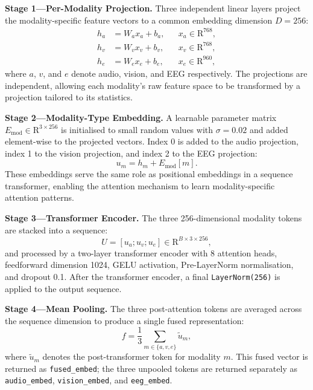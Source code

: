 \textbf{Stage 1---Per-Modality Projection.} Three independent linear layers project the modality-specific feature vectors to a common embedding dimension $D=256$:
\begin{equation}
\begin{aligned}
    h_a &= W_a x_a + b_a, && x_a \in \mathrm{R}^{768}, \\
    h_v &= W_v x_v + b_v, && x_v \in \mathrm{R}^{768}, \\
    h_e &= W_e x_e + b_e, && x_e \in \mathrm{R}^{960},
\end{aligned}
\end{equation}
where $a$, $v$, and $e$ denote audio, vision, and EEG respectively. The projections are independent, allowing each modality's raw feature space to be transformed by a projection tailored to its statistics.

\textbf{Stage 2---Modality-Type Embedding.} A learnable parameter matrix $E_{\mathrm{mod}}\in\mathrm{R}^{3\times256}$ is initialised to small random values with $\sigma=0.02$ and added element-wise to the projected vectors. Index 0 is added to the audio projection, index 1 to the vision projection, and index 2 to the EEG projection:
\begin{equation}
    u_m = h_m + E_{\mathrm{mod}}[m].
\end{equation}
These embeddings serve the same role as positional embeddings in a sequence transformer, enabling the attention mechanism to learn modality-specific attention patterns.

\textbf{Stage 3---Transformer Encoder.} The three 256-dimensional modality tokens are stacked into a sequence:
\begin{equation}
    U = [u_a; u_v; u_e] \in \mathrm{R}^{B\times3\times256},
\end{equation}
and processed by a two-layer transformer encoder with 8 attention heads, feedforward dimension 1024, GELU activation, Pre-LayerNorm normalisation, and dropout 0.1. After the transformer encoder, a final \texttt{LayerNorm(256)} is applied to the output sequence.

\textbf{Stage 4---Mean Pooling.} The three post-attention tokens are averaged across the sequence dimension to produce a single fused representation:
\begin{equation}
    f = \frac{1}{3}\sum_{m\in\{a,v,e\}} \tilde{u}_m,
\end{equation}
where $\tilde{u}_m$ denotes the post-transformer token for modality $m$. This fused vector is returned as \texttt{fused\_embed}; the three unpooled tokens are returned separately as \texttt{audio\_embed}, \texttt{vision\_embed}, and \texttt{eeg\_embed}.

